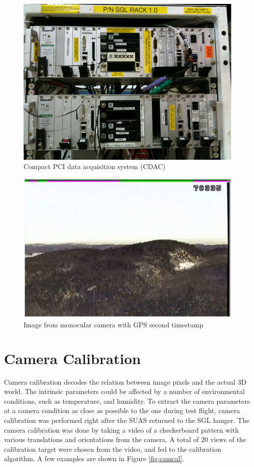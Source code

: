 \begin{figure}[h]
  \centering
  \includegraphics[width=12cm,keepaspectratio=true]{./Figures/CDAC_Rack.jpg}
  \caption{Compact PCI data acquisition system (CDAC)}
  \label{fig:CDAC}
\end{figure}

\begin{figure}[h]
  \centering
  \includegraphics[width=12cm,keepaspectratio=true]{./Figures/video_snapshot.jpg}
  \caption{Image from monocular camera with GPS second timestamp}
  \label{fig:video_snapshot}
\end{figure}

\FloatBarrier

\section{Camera Calibration}\label{sec:camcal}
Camera calibration decodes the relation between image pixels and the
actual 3D world. The intrinsic parameters could be affected by a
number of environmental conditions, such as temperature, and humidity.
To extract the camera parameters at a camera condition as close as
possible to the one during test flight, camera calibration was
performed right after the SUAS returned to the SGL hanger. The camera
calibration was done by taking a video of a checkerboard pattern with
various translations and orientations from the camera. A total of 20 views
of the calibration target were chosen from the video, and fed to the
calibration algorithm. A few examples are shown in Figure
\ref{fig:camcal}.

